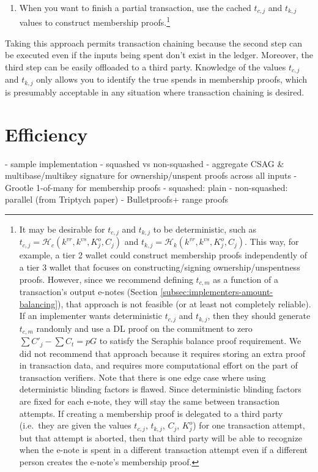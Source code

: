 \begin{itemize}
\begin{enumerate}
        \item When you want to finish a partial transaction, use the cached $t_{c,j}$ and $t_{k,j}$ values to construct membership proofs.\footnote{It may be desirable for $t_{c,j}$ and $t_{k,j}$ to be deterministic, such as $t_{c,j} = \mathcal{H}_c(k^{vr}, k^{vs}, K^o_j, C_j)$ and $t_{k,j} = \mathcal{H}_k(k^{vr}, k^{vs}, K^o_j, C_j)$. This way, for example, a tier 2 wallet could construct membership proofs independently of a tier 3 wallet that focuses on constructing/signing ownership/unspentness proofs. However, since we recommend defining $t_{c,m}$ as a function of a transaction's output e-notes (Section \ref{subsec:implementers-amount-balancing}), that approach is not feasible (or at least not completely reliable). If an implementer wants deterministic $t_{c,j}$ and $t_{k,j}$, then they should generate $t_{c,m}$ randomly and use a DL proof on the commitment to zero $\sum C'_j - \sum C_t = p G$ to satisfy the Seraphis balance proof requirement. We did not recommend that approach because it requires storing an extra proof in transaction data, and requires more computational effort on the part of transaction verifiers. Note that there is one edge case where using deterministic blinding factors is flawed. Since deterministic blinding factors are fixed for each e-note, they will stay the same between transaction attempts. If creating a membership proof is delegated to a third party (i.e.\ they are given the values $t_{c,j}$, $t_{k,j}$, $C_j$, $K^o_j$) for one transaction attempt, but that attempt is aborted, then that third party will be able to recognize when the e-note is spent in a different transaction attempt even if a different person creates the e-note's membership proof.}
    \end{enumerate}

    Taking this approach permits transaction chaining because the second step can be executed even if the inputs being spent don't exist in the ledger. Moreover, the third step can be easily offloaded to a third party. Knowledge of the values $t_{c,j}$ and $t_{k,j}$ only allows you to identify the true spends in membership proofs, which is presumably acceptable in any situation where transaction chaining is desired.
\end{itemize}



\section{Efficiency}
\label{sec:efficiency}

- sample implementation
    - squashed vs non-squashed
    - aggregate CSAG \& multibase/multikey signature for ownership/unspent proofs across all inputs
    - Grootle 1-of-many for membership proofs
        - squashed: plain
        - non-squashed: parallel (from Triptych paper)
    - Bulletproofs+ range proofs
